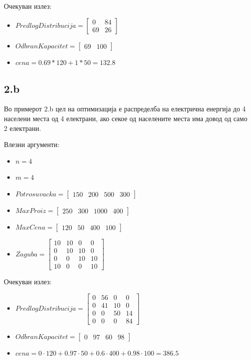 \documentclass{article}
\begin{document}
Очекуван излез:
\begin{itemize}
\item $PredlogDistribucija = \begin{bmatrix} 0 & 84 \\ 69 & 26 \end{bmatrix}$
\item $OdbranKapacitet = \begin{bmatrix} 69 & 100 \end{bmatrix}$
\item $cena = 0.69 * 120 + 1 * 50 = 132.8$
\end{itemize}

\subsection{2.b}
Во примерот 2.b цел на оптимизација е распределба на електрична енергија до 4 населени места од 4 електрани, ако секое од населените места има довод од само 2 електрани. 

Влезни аргументи:
\begin{itemize}
\item $n = 4$
\item $m = 4$
\item $Potrosuvacka = \begin{bmatrix} 150 & 200 & 500 & 300 \end{bmatrix}$
\item $MaxProiz = \begin{bmatrix} 250 & 300 & 1000 & 400\end{bmatrix}$
\item $MaxCena = \begin{bmatrix} 120 & 50 & 400 & 100 \end{bmatrix}$
\item $Zaguba = \begin{bmatrix} 10 & 10 & 0 & 0 \\ 0 & 10 & 10 & 0 \\ 0 & 0 & 10 & 10 \\ 10 & 0 & 0 & 10 \end{bmatrix}$
\end{itemize}
Очекуван излез:
\begin{itemize}
\item $PredlogDistribucija = \begin{bmatrix} 0 & 56 & 0 & 0 \\ 0 & 41 & 10 & 0 \\ 0 & 0 & 50 & 14 \\ 0 & 0 & 0 & 84 \end{bmatrix}$
\item $OdbranKapacitet = \begin{bmatrix} 0 & 97 & 60 & 98 \end{bmatrix}$
\item $cena = 0 \cdot 120 + 0.97 \cdot 50 + 0.6 \cdot 400 + 0.98 \cdot 100  = 386.5$
\end{itemize}
\end{document}
